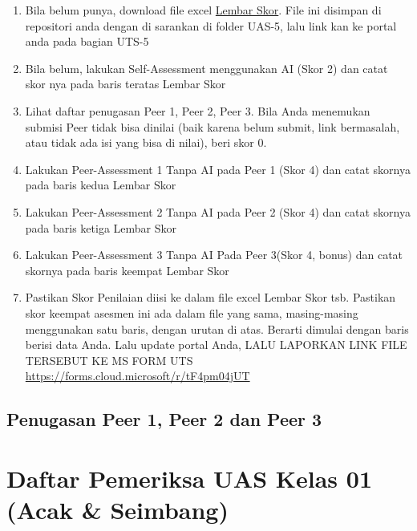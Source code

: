 \documentclass[
  letterpaper,
  DIV=11,
  numbers=noendperiod]{scrreprt}
\providecommand{\tightlist}{%
  \setlength{\itemsep}{0pt}\setlength{\parskip}{0pt}}
\begin{document}
\begin{enumerate}
\def\labelenumi{\arabic{enumi}.}
\tightlist
\item
  Bila belum punya, download file excel \href{./UAS-5_Skor.xlsx}{Lembar
  Skor}. File ini disimpan di repositori anda dengan di sarankan di
  folder UAS-5, lalu link kan ke portal anda pada bagian UTS-5
\item
  Bila belum, lakukan Self-Assessment menggunakan AI (Skor 2) dan catat
  skor nya pada baris teratas Lembar Skor
\item
  Lihat daftar penugasan Peer 1, Peer 2, Peer 3. Bila Anda menemukan
  submisi Peer tidak bisa dinilai (baik karena belum submit, link
  bermasalah, atau tidak ada isi yang bisa di nilai), beri skor 0.
\item
  Lakukan Peer-Assessment 1 Tanpa AI pada Peer 1 (Skor 4) dan catat
  skornya pada baris kedua Lembar Skor
\item
  Lakukan Peer-Assessment 2 Tanpa AI pada Peer 2 (Skor 4) dan catat
  skornya pada baris ketiga Lembar Skor
\item
  Lakukan Peer-Assessment 3 Tanpa AI Pada Peer 3(Skor 4, bonus) dan
  catat skornya pada baris keempat Lembar Skor
\item
  Pastikan Skor Penilaian diisi ke dalam file excel Lembar Skor tsb.
  Pastikan skor keempat asesmen ini ada dalam file yang sama,
  masing-masing menggunakan satu baris, dengan urutan di atas. Berarti
  dimulai dengan baris berisi data Anda. Lalu update portal Anda, LALU
  LAPORKAN LINK FILE TERSEBUT KE MS FORM UTS
  \url{https://forms.cloud.microsoft/r/tF4pm04jUT}
\end{enumerate}

\section*{Penugasan Peer 1, Peer 2 dan Peer
3}\label{penugasan-peer-1-peer-2-dan-peer-3-1}



\chapter*{Daftar Pemeriksa UAS Kelas 01 (Acak \&
Seimbang)}\label{daftar-pemeriksa-uas-kelas-01-acak-seimbang}
\end{document}
